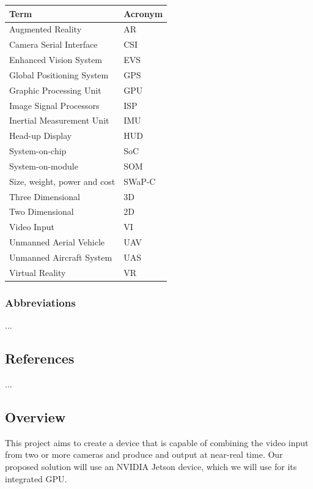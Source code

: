 \documentclass[letterpaper,10pt,serif,draftclsnofoot,onecolumn,compsoc,titlepage]{IEEEtran}
\begin{document}
\begin{tabular}{|l|l|}
\hline
\textbf{Term} & \textbf{Acronym}\\
\hline
Augmented Reality & AR\\
\hline
Camera Serial Interface & CSI\\
\hline
Enhanced Vision System & EVS\\
\hline
Global Positioning System & GPS\\
\hline
Graphic Processing Unit & GPU\\
\hline
Image Signal Processors & ISP\\
\hline
Inertial Measurement Unit & IMU\\
\hline
Head-up Display & HUD\\
\hline
System-on-chip & SoC\\
\hline
System-on-module & SOM\\
\hline
Size, weight, power and cost & SWaP-C\\
\hline
Three Dimensional & 3D\\
\hline
Two Dimensional & 2D\\
\hline
Video Input & VI\\
\hline
Unmanned Aerial Vehicle & UAV\\
\hline
Unmanned Aircraft System & UAS\\
\hline
Virtual Reality & VR\\
\hline
\end{tabular}

\subsubsection{Abbreviations}

...

\subsection{References}

...

\subsection{Overview}

This project aims to create a device that is capable of combining the video input from 
two or more cameras and produce and output at near-real time. Our proposed solution 
will use an NVIDIA Jetson device, which we will use for its integrated GPU.\\
\end{document}
